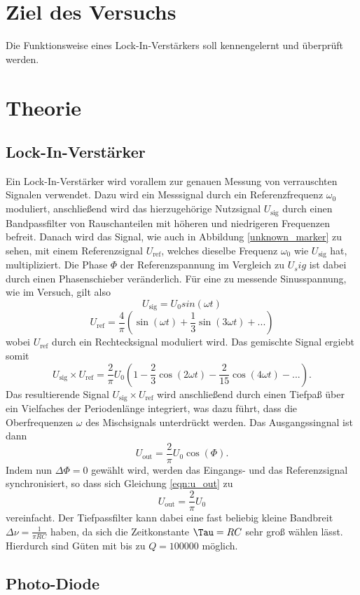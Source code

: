 \section{Ziel des Versuchs}
\label{sec:Ziel des Versuchs}
Die Funktionsweise eines Lock-In-Verstärkers soll kennengelernt und überprüft werden.
\section{Theorie}
\label{sec:Theorie}
\subsection{Lock-In-Verstärker}
    Ein Lock-In-Verstärker wird vorallem zur genauen Messung von verrauschten Signalen verwendet.
    Dazu wird ein Messsignal durch ein Referenzfrequenz $\omega_0$ moduliert, anschließend wird das
    hierzugehörige Nutzsignal $U_\text{sig}$ durch einen Bandpassfilter von Rauschanteilen mit höheren und niedrigeren Frequenzen
    befreit. Danach wird das Signal, wie auch in Abbildung \ref{unknown_marker} zu sehen, mit einem Referenzsignal
    $U_\text{ref}$, welches dieselbe Frequenz $\omega_0$ wie $U_\text{sig}$ hat, multipliziert. Die Phase $\Phi$ der Referenzspannung im Vergleich zu $U_sig$
    ist dabei durch einen Phasenschieber veränderlich. 
    Für eine zu messende Sinusspannung, wie im Versuch, gilt also
    \begin{equation}
        U_\text{sig} = U_0 sin(\omega t)
    \end{equation} 
    \begin{equation}
        U_\text{ref} = \frac {4}{\pi} (\sin (\omega t) + \frac {1}{3} \sin(3 \omega t) + ... )
    \end{equation}
    wobei $U_\text{ref}$ durch ein Rechtecksignal moduliert wird. Das gemischte Signal ergiebt somit
    \begin{equation}
        U_\text{sig} \times U_\text{ref} = \frac {2}{\pi} U_0 (1- \frac{2}{3} \cos (2 \omega t) - \frac {2}{15} \cos (4 \omega t) - ...).
    \end{equation}
        Das resultierende Signal $U_\text{sig} \times U_\text{ref}$ wird anschließend durch einen Tiefpaß über ein Vielfaches der Periodenlänge
        integriert, was dazu führt, dass die Oberfrequenzen $\omega$ des Mischsignals unterdrückt werden. Das Ausgangssingnal ist dann
        \begin{equation}
        \label{eqn:u_out}
            U_\text{out} = \frac{2}{\pi} U_0 \cos (\Phi) .
        \end{equation}
        Indem nun $\Delta \Phi = 0$ gewählt wird, werden das Eingangs- und das Referenzsignal synchronisiert, so dass sich Gleichung \ref{eqn:u_out}
        zu
        \begin{equation}
            U_\text{out} = \frac{2}{\pi} U_0
        \end{equation}
        vereinfacht. Der Tiefpassfilter kann dabei eine fast beliebig kleine Bandbreit $\Delta \nu  = \frac{1}{\pi R C}$ haben, da sich die Zeitkonstante $\Tau = R C$ sehr groß wählen lässt.
        Hierdurch sind Güten mit bis zu $Q = 100000$ möglich.
\subsection{Photo-Diode}